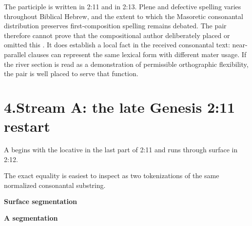The participle is written  in 2:11 and  in 2:13.  Plene and defective spelling varies throughout Biblical Hebrew, and the extent to which the Masoretic consonantal distribution preserves first-composition spelling remains debated.\cite{Elitzur2023,Hornkohl2024}  The pair therefore cannot prove that the compositional author deliberately placed or omitted this .  It does establish a local fact in the received consonantal text: near-parallel clauses can represent the same lexical form with different mater usage.  If the river section is read as a demonstration of permissible orthographic flexibility, the pair is well placed to serve that function.

\section*{4.\quad Stream A: the late Genesis 2:11 restart}

A begins with the locative  in the last part of 2:11 and runs through surface  in 2:12.

The exact equality is easiest to inspect as two tokenizations of the same normalized consonantal substring.

\noindent
\begin{minipage}[t]{0.48\linewidth}
{\centering\textbf{Surface segmentation}\par}
\end{minipage}
\hfill
\begin{minipage}[t]{0.48\linewidth}
{\centering\textbf{A segmentation}\par}
\end{minipage}

